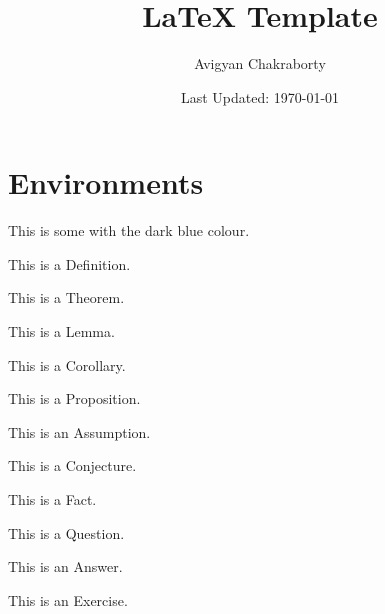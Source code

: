 \documentclass[12pt]{scrartcl}
\title{LaTeX Template}
\author{Avigyan Chakraborty}
\date{Last Updated: \today}
\begin{document}
\maketitle

\tableofcontents

\pagebreak

\section{Environments}

This is some  with the dark blue colour.

\begin{definition}
[Name]
This is a Definition.
\end{definition}

\begin{theorem}
[Name]
This is a Theorem.
\end{theorem}

\begin{lemma}
[Name]
This is a Lemma.
\end{lemma}

\begin{corollary}
[Name]
This is a Corollary.
\end{corollary}

\begin{proposition}
[Name]
This is a Proposition.
\end{proposition}

\begin{assume}
[Name]
This is an Assumption.
\end{assume}

\begin{conjecture}
[Name]
This is a Conjecture.
\end{conjecture}

\begin{fact}
[Name]
This is a Fact.
\end{fact}

\begin{ques}
[Name]
This is a Question.
\end{ques}

\begin{answer}
[Name]
This is an Answer.
\end{answer}

\begin{exercise}
[Name]
This is an Exercise.
\end{exercise}
\end{document}
